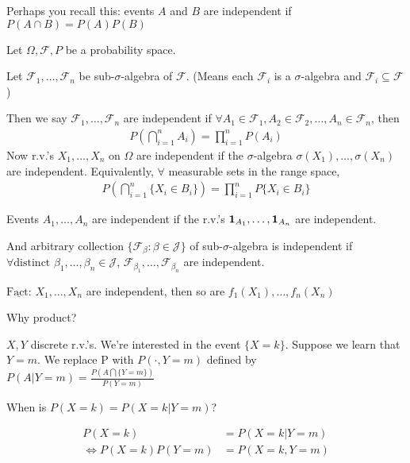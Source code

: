 \documentclass[11pt]{article}
\begin{document}
Perhaps you recall this: events $A$ and $B$ are independent if $P(A \cap B) = P(A)P(B)$

\begin{definition}
    Let $\Omega, \mathcal{F}, P$ be a probability space. 

    Let $\mathcal{F}_1, \ldots ,\mathcal{F}_n$ be sub-$\sigma$-algebra of $\mathcal{F}$. (Means
    each $\mathcal{F}_i$ is a $\sigma$-algebra and $\mathcal{F}_i \subseteq \mathcal{F}$)

    Then we say $\mathcal{F}_1, \ldots ,\mathcal{F}_n$ are independent if $\forall A_1 \in \mathcal{F}_1,
    A_2 \in \mathcal{F}_2, \ldots ,A_n \in \mathcal{F}_n$, then
    \begin{align*}
        P(\bigcap_{i=1}^{n} A_i) = \prod_{i=1}^{n}P(A_i) 
    \end{align*}
    Now r.v.'s $X_1, \ldots ,X_n$ on $\Omega$ are independent if the $\sigma$-algebra 
    $\sigma(X_1), \ldots ,\sigma(X_n)$ are independent. Equivalently, $\forall $ measurable 
    sets in the range space,
    \begin{align*}
       P(\bigcap_{i=1}^{n}\{X_{i} \in B_i\}) = \prod_{i=1}^{n} P\{X_{i} \in B_i\} 
    \end{align*}
\end{definition}

Events $A_1, \ldots ,A_n$ are independent if the r.v.'s $\bm{1}_{A_1}, \ldots ,\bm{1}_{A_n}$ are independent.

And arbitrary collection $\{\mathcal{F}_{\beta}: \beta \in \mathcal{J}\}$ of sub-$\sigma$-algebra is independent if
$\forall \text{distinct } \beta_1, \ldots ,\beta_{n} \in \mathcal{J}$, $\mathcal{F}_{\beta_{1}}, \ldots ,\mathcal{F}_{\beta_{n}}$
are independent.

\begin{claim}
    $\underline{\text{Fact:}}$ $X_1, \ldots ,X_n$ are independent, then so are 
    $f_1(X_1), \ldots ,f_n(X_n)$
\end{claim}

\begin{remark}
    Why product?

    $X,Y$ discrete r.v.'s. We're interested in the event $\{X=k\}$. Suppose we learn that $Y=m$.
    We replace P with $P(\cdot , Y=m)$ defined by $P(A| Y=m) = \frac{P(A \bigcap \{Y=m\})}{P(Y=m)}$

    When is $P(X=k) = P(X=k | Y=m)$?

    \begin{align*}
        P(X=k) &= P(X=k | Y=m)\\
        \iff P(X=k)P(Y=m) &= P(X=k,Y=m)
    \end{align*}
\end{remark}
\end{document}
